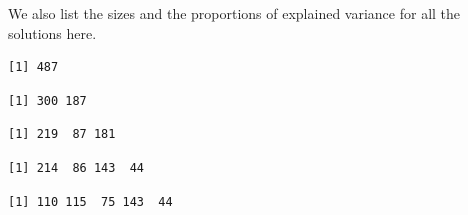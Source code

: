 \documentclass[
  11pt,
]{article}
\newenvironment{Shaded}{\begin{snugshade}}{\end{snugshade}}
\newcommand{\DocumentationTok}[1]{\textcolor[rgb]{0.56,0.35,0.01}{\textbf{\textit{#1}}}}
\newcommand{\NormalTok}[1]{#1}
\newcommand{\SpecialCharTok}[1]{\textcolor[rgb]{0.00,0.00,0.00}{#1}}
\begin{document}
We also list the sizes and the proportions of explained variance for all the solutions here.

\begin{Shaded}
\end{Shaded}

\begin{verbatim}
[1] 487
\end{verbatim}

\begin{Shaded}
\end{Shaded}

\begin{verbatim}
[1] 300 187
\end{verbatim}

\begin{Shaded}
\end{Shaded}

\begin{verbatim}
[1] 219  87 181
\end{verbatim}

\begin{Shaded}
\end{Shaded}

\begin{verbatim}
[1] 214  86 143  44
\end{verbatim}

\begin{Shaded}
\end{Shaded}

\begin{verbatim}
[1] 110 115  75 143  44
\end{verbatim}
\end{document}
